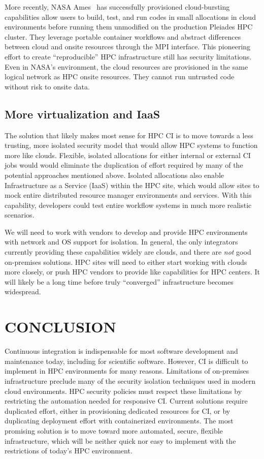 \documentclass{IEEEcsmag}
\begin{document}
More recently, NASA Ames~\cite{ames-hybrid-cloud} has successfully provisioned cloud-bursting
capabilities allow users to build, test, and run codes in small allocations in cloud
environments before running them unmodified on the production Pleiades HPC cluster.
They leverage portable container workflows and abstract differences between cloud and
onsite resources through the MPI interface. This pioneering effort to create
``reproducible'' HPC infrastructure still has security limitations. Even in NASA's
environment, the cloud resources are provisioned in the same logical network as HPC
onsite resources. They cannot run untrusted code without risk to onsite data.

\subsection{More virtualization and IaaS}

The solution that likely makes most sense for HPC CI is to move towards a less trusting,
more isolated security model that would allow HPC systems to function more like clouds.
Flexible, isolated allocations for either internal or external CI jobs would
would eliminate the duplication of effort required by many of the potential
approaches mentioned above. Isolated allocations also enable Infrastructure as a Service (IaaS)
within the HPC site, which would allow sites to mock entire distributed resource manager
environments and services. With this capability, developers could test entire workflow systems
in much more realistic scenarios.

We will need to work with vendors to develop and provide HPC environments with network
and OS support for isolation. In general, the only integrators currently providing these
capabilities widely are clouds, and there are {\it not} good on-premises solutions. HPC
sites will need to either start working with clouds more closely, or push
HPC vendors to provide like capabilities for HPC centers. It will likely be a long time
before truly ``converged'' infrastructure becomes widespread.


\section{CONCLUSION}

Continuous integration is indispensable for most software development and
maintenance today, including for scientific software.
However, CI is difficult to implement in HPC environments for many reasons.
Limitations of on-premises infrastructure preclude many of the security isolation
techniques used in modern cloud environments. HPC security policies must respect these
limitations by restricting the automation needed for responsive CI. Current solutions
require duplicated effort, either in provisioning dedicated resources for CI, or by
duplicating deployment effort with containerized environments. The most promising
solution is to move toward more automated, secure, flexible infrastructure,
which will be
neither quick nor easy to implement with the restrictions of today's HPC environment.
\end{document}
